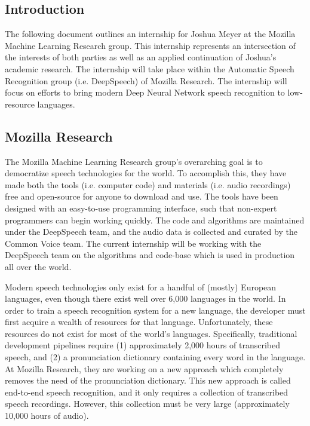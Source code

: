 \documentclass[12pt,a4paper]{article}
\begin{document}
\subsection*{Introduction}

The following document outlines an internship for Joshua Meyer at the Mozilla Machine Learning Research group. This internship represents an intersection of the interests of both parties as well as an applied continuation of Joshua's academic research. The internship will take place within the Automatic Speech Recognition group (i.e. DeepSpeech) of Mozilla Research. The internship will focus on efforts to bring modern Deep Neural Network speech recognition to low-resource languages.

\subsection*{Mozilla Research}

The Mozilla Machine Learning Research group's overarching goal is to democratize speech technologies for the world. To accomplish this, they have made both the tools (i.e. computer code) and materials (i.e. audio recordings) free and open-source for anyone to download and use. The tools have been designed with an easy-to-use programming interface, such that non-expert programmers can begin working quickly. The code and algorithms are maintained under the DeepSpeech team, and the audio data is collected and curated by the Common Voice team. The current internship will be working with the DeepSpeech team on the algorithms and code-base which is used in production all over the world.

Modern speech technologies only exist for a handful of (mostly) European languages, even though there exist well over 6,000 languages in the world. In order to train a speech recognition system for a new language, the developer must first acquire a wealth of resources for that language. Unfortunately, these resources do not exist for most of the world's languages. Specifically, traditional development pipelines require (1) approximately 2,000 hours of transcribed speech, and (2) a pronunciation dictionary containing every word in the language. At Mozilla Research, they are working on a new approach which completely removes the need of the pronunciation dictionary. This new approach is called end-to-end speech recognition, and it only requires a collection of transcribed speech recordings. However, this collection must be very large (approximately 10,000 hours of audio).
\end{document}
